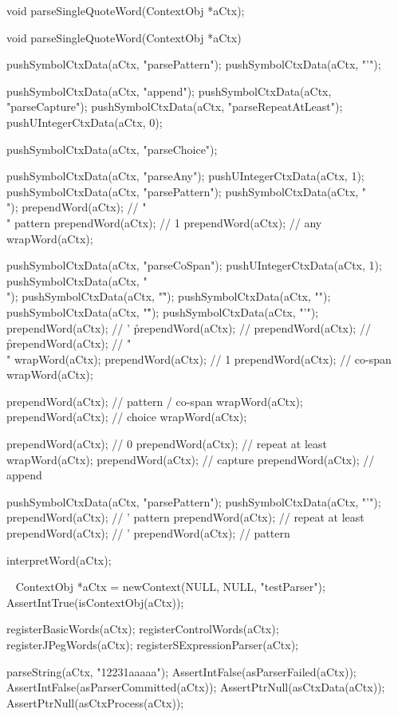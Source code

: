\startCHeader
void parseSingleQuoteWord(ContextObj *aCtx);
\stopCHeader

\startCCode
void parseSingleQuoteWord(ContextObj *aCtx) {

  pushSymbolCtxData(aCtx, "parsePattern");
  pushSymbolCtxData(aCtx, "'");

  pushSymbolCtxData(aCtx, "append");
  pushSymbolCtxData(aCtx, "parseCapture");
  pushSymbolCtxData(aCtx, "parseRepeatAtLeast");
  pushUIntegerCtxData(aCtx, 0);

  pushSymbolCtxData(aCtx, "parseChoice");

  pushSymbolCtxData(aCtx, "parseAny");
  pushUIntegerCtxData(aCtx, 1);
  pushSymbolCtxData(aCtx, "parsePattern");
  pushSymbolCtxData(aCtx, "\\");
  prependWord(aCtx);  // "\\" pattern
  prependWord(aCtx);  // 1
  prependWord(aCtx);  // any
  wrapWord(aCtx);

  pushSymbolCtxData(aCtx, "parseCoSpan");
  pushUIntegerCtxData(aCtx, 1);
  pushSymbolCtxData(aCtx, "\\");
  pushSymbolCtxData(aCtx, "\f");
  pushSymbolCtxData(aCtx, "\n");
  pushSymbolCtxData(aCtx, "\r");
  pushSymbolCtxData(aCtx, "'");
  prependWord(aCtx);  // ' \r
  prependWord(aCtx);  // \n
  prependWord(aCtx);  // \f
  prependWord(aCtx);  // "\\"
  wrapWord(aCtx);
  prependWord(aCtx);  // 1
  prependWord(aCtx);  // co-span
  wrapWord(aCtx);
  
  prependWord(aCtx);  // pattern / co-span
  wrapWord(aCtx);
  prependWord(aCtx);  // choice
  wrapWord(aCtx);
  
  prependWord(aCtx);  // 0
  prependWord(aCtx);  // repeat at least
  wrapWord(aCtx);
  prependWord(aCtx);  // capture
  prependWord(aCtx);  // append
  
  pushSymbolCtxData(aCtx, "parsePattern");
  pushSymbolCtxData(aCtx, "'");
  prependWord(aCtx);  // ' pattern
  prependWord(aCtx);  // repeat at least
  prependWord(aCtx);  // '
  prependWord(aCtx);  // pattern

  interpretWord(aCtx);
}
\stopCCode

\CTestsSuiteSetup\
\startCTest
  ContextObj *aCtx = newContext(NULL, NULL, "testParser");
  AssertIntTrue(isContextObj(aCtx));
  
  registerBasicWords(aCtx);
  registerControlWords(aCtx);
  registerJPegWords(aCtx);
  registerSExpressionParser(aCtx);
\stopCTest

\startCTest
  parseString(aCtx, "12231aaaaa");
  AssertIntFalse(asParserFailed(aCtx));
  AssertIntFalse(asParserCommitted(aCtx));
  AssertPtrNull(asCtxData(aCtx));
  AssertPtrNull(asCtxProcess(aCtx));


